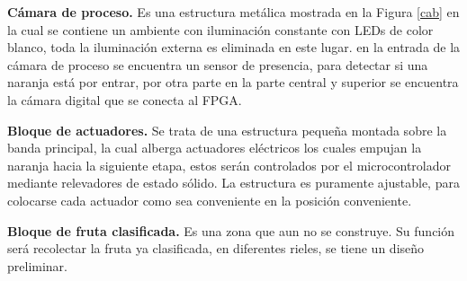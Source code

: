 \documentclass[twoside,spanish,ESP,MSc]{plantillaLabUPV}
\theoremstyle{definition}
\begin{document}

\checkmark\textbf{Cámara de proceso.} Es una estructura metálica mostrada en la Figura \ref{cab} en la cual se contiene un ambiente con iluminación constante con LEDs de color blanco, toda la iluminación externa es eliminada en este lugar. en la entrada de la cámara de proceso se encuentra un sensor de presencia, para detectar si una naranja está por entrar, por otra parte en la parte central y superior se encuentra la cámara digital que se conecta al FPGA.



\checkmark\textbf{Bloque de actuadores.} Se trata de una estructura pequeña montada sobre la banda principal, la cual alberga actuadores eléctricos los cuales empujan la naranja hacia la siguiente etapa, estos serán controlados por el microcontrolador mediante relevadores de estado sólido. La estructura es puramente ajustable, para colocarse cada actuador como sea conveniente en la posición conveniente.



\checkmark\textbf{Bloque de fruta clasificada.} Es una zona que aun no se construye. Su función será recolectar la fruta ya clasificada, en diferentes rieles, se tiene un diseño preliminar.
\end{document}
